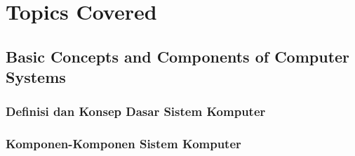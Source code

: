\documentclass[12pt]{article}
\begin{document}
\section{Topics Covered}

\subsection{Basic Concepts and Components of Computer Systems}
\subsubsection{Definisi dan Konsep Dasar Sistem Komputer}
\subsubsection{Komponen-Komponen Sistem Komputer}
\end{document}
